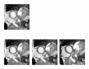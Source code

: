 \documentclass[xcolor=svgnames,handout]{beamer}
\begin{document}
\begin{frame}
\begin{itemize}
\begin{center}
    \hspace{0.15cm}
    \includegraphics[width=50]{19.png}
  \end{center}
  
  \begin{center}
    \includegraphics[width=50]{21.png}
    \hspace{0.15cm}
    \includegraphics[width=50]{23.png}
    \hspace{0.15cm}
    \includegraphics[width=50]{25.png}

\end{center}
\end{itemize}
\end{frame}
\end{document}
